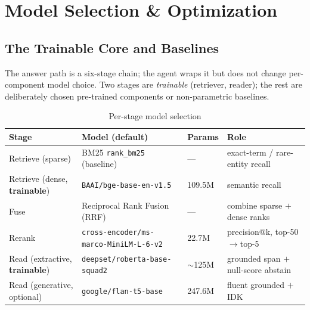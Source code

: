 \documentclass[12pt,a4paper]{article}
\begin{document}
\section{Model Selection \& Optimization}

\subsection{The Trainable Core and Baselines}

The answer path is a six-stage chain; the agent wraps it but does not change per-component model choice. Two stages are \emph{trainable} (retriever, reader); the rest are deliberately chosen pre-trained components or non-parametric baselines.

\begin{table}[H]
\centering
\caption{Per-stage model selection}
\scriptsize
\setlength{\tabcolsep}{4pt}
\begin{tabularx}{\linewidth}{@{} l L l l @{}}
\toprule
\textbf{Stage} & \textbf{Model (default)} & \textbf{Params} & \textbf{Role} \\
\midrule
Retrieve (sparse) & BM25 \texttt{rank\_bm25} (baseline) & --- & exact-term / rare-entity recall \\
Retrieve (dense, \textbf{trainable}) & \texttt{BAAI/bge-base-en-v1.5} & 109.5M & semantic recall \\
Fuse & Reciprocal Rank Fusion (RRF) & --- & combine sparse $+$ dense ranks \\
Rerank & \texttt{cross-encoder/ms-marco-MiniLM-L-6-v2} & 22.7M & precision@k, top-50$\rightarrow$top-5 \\
Read (extractive, \textbf{trainable}) & \texttt{deepset/roberta-base-squad2} & $\sim$125M & grounded span $+$ null-score abstain \\
Read (generative, optional) & \texttt{google/flan-t5-base} & 247.6M & fluent grounded $+$ IDK \\
\bottomrule
\end{tabularx}
\end{table}
\end{document}
